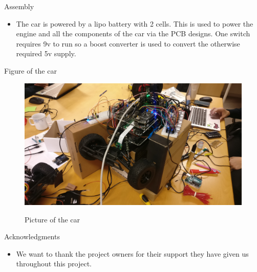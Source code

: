 \documentclass[final,hyperref={pdfpagelabels=false}]{beamer}
\begin{document}
\begin{frame}[t]
\begin{columns}[t]
\begin{column}{.465\textwidth}
\begin{block}{Assembly}
\begin{itemize}
            
            \item The car is powered by a lipo battery with 2 cells. This is used to power the engine and all the components of the car via the PCB designs. One switch requires 9v to run so a boost converter is used to convert the otherwise required 5v supply.
              
        \end{itemize}
    
    \end{block}
\begin{block}{Figure of the car}
    \begin{figure}
        \includegraphics[width=1\linewidth]{car1.jpg}
        \label{fig:car1}
        \caption{Picture of the car}
    \end{figure}
\end{block}


%
%



\begin{block}{Acknowledgments}

\begin{itemize}
\item We want to thank the project owners for their support they have given us throughout this project. 
\end{itemize}


\end{block}
\end{column}
\end{columns}
\end{frame}
\end{document}
